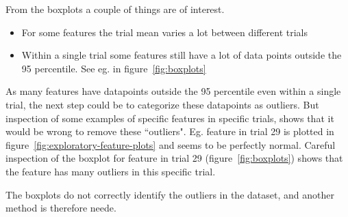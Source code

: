 From the boxplots a couple of things are of interest.
\begin{itemize}
    \item For some features the trial mean varies a lot between different trials 
    \item Within a single trial some features still have a lot of data points outside the 95 percentile. See eg.  in figure~\ref{fig:boxplots} 
\end{itemize}
As many features have datapoints outside the 95 percentile even within a single trial, the next step could be to categorize these datapoints as outliers. But inspection of some examples of specific features in specific trials, shows that it would be wrong to remove these ``outliers". Eg. feature  in trial 29 is plotted in figure~\ref{fig:exploratory-feature-plots} and seems to be perfectly normal. Careful inspection of the boxplot for feature  in trial 29 (figure~\ref{fig:boxplots}) shows that the feature has many outliers in this specific trial. \par
The boxplots do not correctly identify the outliers in the dataset, and another method is therefore neede.

